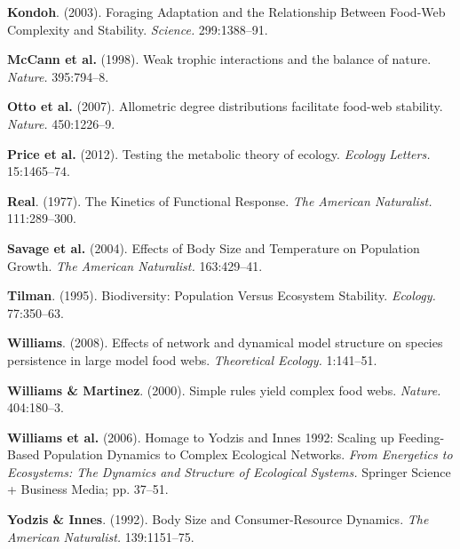 \documentclass[12pt]{article}
\begin{document}
\hypertarget{ref-kond03far}{}
\textbf{Kondoh}. (2003). Foraging Adaptation and the Relationship
Between Food-Web Complexity and Stability. \emph{Science.} 299:1388--91.

\hypertarget{ref-mcca98wti}{}
\textbf{McCann et al.} (1998). Weak trophic interactions and the balance
of nature. \emph{Nature.} 395:794--8.

\hypertarget{ref-otto07add}{}
\textbf{Otto et al.} (2007). Allometric degree distributions facilitate
food-web stability. \emph{Nature.} 450:1226--9.

\hypertarget{ref-pric12tmt}{}
\textbf{Price et al.} (2012). Testing the metabolic theory of ecology.
\emph{Ecology Letters.} 15:1465--74.

\hypertarget{ref-real77kfr}{}
\textbf{Real}. (1977). The Kinetics of Functional Response. \emph{The
American Naturalist.} 111:289--300.

\hypertarget{ref-sava04ebs}{}
\textbf{Savage et al.} (2004). Effects of Body Size and Temperature on
Population Growth. \emph{The American Naturalist.} 163:429--41.

\hypertarget{ref-tilm96bpv}{}
\textbf{Tilman}. (1995). Biodiversity: Population Versus Ecosystem
Stability. \emph{Ecology.} 77:350--63.

\hypertarget{ref-will08end}{}
\textbf{Williams}. (2008). Effects of network and dynamical model
structure on species persistence in large model food webs.
\emph{Theoretical Ecology.} 1:141--51.

\hypertarget{ref-will00sry}{}
\textbf{Williams \& Martinez}. (2000). Simple rules yield complex food
webs. \emph{Nature.} 404:180--3.

\hypertarget{ref-will07hyi}{}
\textbf{Williams et al.} (2006). Homage to Yodzis and Innes 1992:
Scaling up Feeding-Based Population Dynamics to Complex Ecological
Networks. \emph{From Energetics to Ecosystems: The Dynamics and
Structure of Ecological Systems.} Springer Science + Business Media; pp.
37--51.

\hypertarget{ref-yodz92bsc}{}
\textbf{Yodzis \& Innes}. (1992). Body Size and Consumer-Resource
Dynamics. \emph{The American Naturalist.} 139:1151--75.
\end{document}
